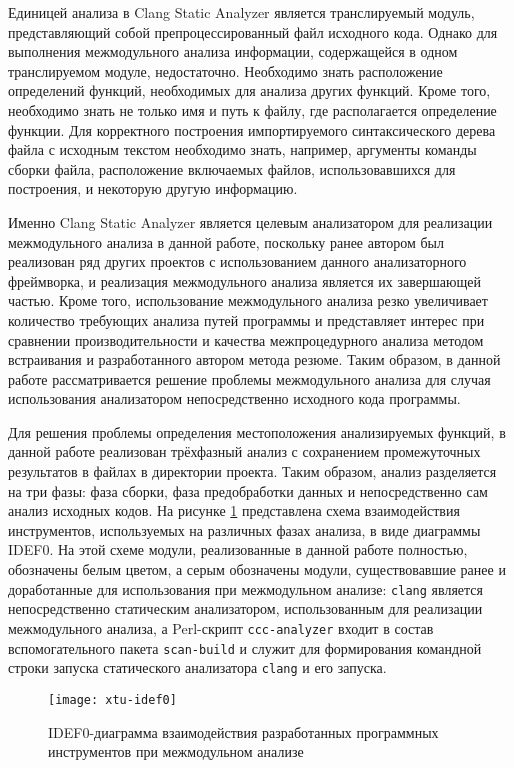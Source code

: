 Единицей анализа в Clang Static Analyzer является транслируемый модуль, представляющий собой препроцессированный файл исходного кода. Однако для выполнения межмодульного анализа информации, содержащейся в одном транслируемом модуле, недостаточно. Необходимо знать расположение определений функций, необходимых для анализа других функций. Кроме того, необходимо знать не только имя и путь к файлу, где располагается определение функции. Для корректного построения импортируемого синтаксического дерева файла с исходным текстом необходимо знать, например, аргументы команды сборки файла, расположение включаемых файлов, использовавшихся для построения, и некоторую другую информацию.

Именно Clang Static Analyzer является целевым анализатором для реализации межмодульного анализа в данной работе, поскольку ранее автором был реализован ряд других проектов с использованием данного анализаторного фреймворка, и реализация межмодульного анализа является их завершающей частью. Кроме того, использование межмодульного анализа резко увеличивает количество требующих анализа путей программы и представляет интерес при сравнении производительности и качества межпроцедурного анализа методом встраивания и разработанного автором метода резюме. Таким образом, в данной работе рассматривается решение проблемы межмодульного анализа для случая использования анализатором непосредственно исходного кода программы.

Для решения проблемы определения местоположения анализируемых функций, в данной работе реализован трёхфазный анализ с сохранением промежуточных результатов в файлах в директории проекта. Таким образом, анализ разделяется на три фазы: фаза сборки, фаза предобработки данных и непосредственно сам анализ исходных кодов. На рисунке \ref{xtu-idef0} представлена схема взаимодействия инструментов, используемых на различных фазах анализа, в виде диаграммы IDEF0. На этой схеме модули, реализованные в данной работе полностью, обозначены белым цветом, а серым обозначены модули, существовавшие ранее и доработанные для использования при межмодульном анализе: \texttt{clang} является непосредственно статическим анализатором, использованным для реализации межмодульного анализа, а Perl-скрипт \texttt{ccc-analyzer} входит в состав вспомогательного пакета \texttt{scan-build} и служит для формирования командной строки запуска статического анализатора \texttt{clang} и его запуска.

\begin{figure}[h]
 \label{}
 \centering
 \texttt{[image: xtu-idef0]}
 \caption{IDEF0-диаграмма взаимодействия разработанных программных инструментов при межмодульном анализе}\label{xtu-idef0}
\end{figure}


